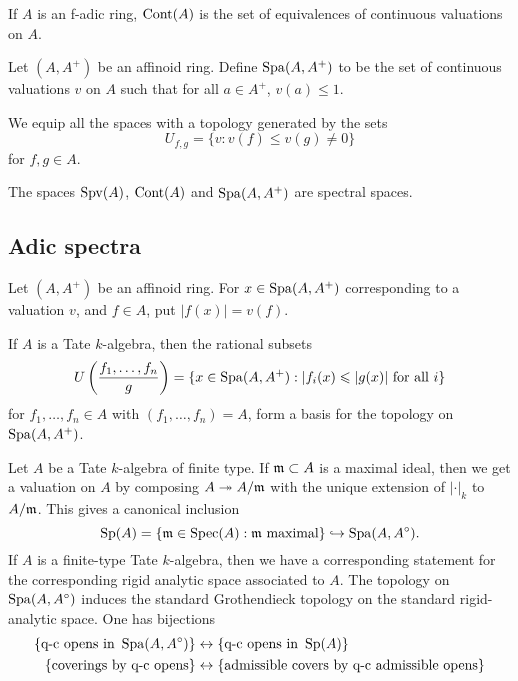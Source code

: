 \begin{definition}
If $A$ is an f-adic ring, $\operatorname{Cont}(A)$ is the set of equivalences of continuous 
valuations on $A$. 
\end{definition}

\begin{definition}
Let $(A,A^+)$ be an affinoid ring. Define $\operatorname{Spa}(A,A^+)$ to be the set of 
continuous valuations $v$ on $A$ such that for all $a\in A^+$, 
$v(a)\leqslant 1$. 
\end{definition}

We equip all the spaces with a topology generated by the sets 
\[
  U_{f,g} = \{v : v(f)\leqslant v(g)\ne 0\}
\]
for $f,g\in A$. 

\begin{theorem}
The spaces $\operatorname{Spv}(A)$, $\operatorname{Cont}(A)$ and $\operatorname{Spa}(A,A^+)$ are spectral spaces. 
\end{theorem}





\subsection{Adic spectra}

Let $(A,A^+)$ be an affinoid ring. For $x\in \operatorname{Spa}(A,A^+)$ corresponding to a 
valuation $v$, and $f\in A$, put $|f(x)| = v(f)$. 

If $A$ is a Tate $k$-algebra, then the rational subsets 
\[
  U\left(\frac{f_1,\dots,f_n}{g}\right) = \{x\in \operatorname{Spa}(A,A^+):|f_i(x)\leqslant |g(x)|\text{ for all }i\}
\]
for $f_1,\dots,f_n\in A$ with $(f_1,\dots,f_n) = A$, form a basis for the 
topology on $\operatorname{Spa}(A,A^+)$. 

\begin{example}
Let $A$ be a Tate $k$-algebra of finite type. If $\mathfrak{m}\subset A$ is a maximal 
ideal, then we get a valuation on $A$ by composing $A\twoheadrightarrow A/\mathfrak{m}$ 
with the unique extension of $|\cdot |_k$ to $A/\mathfrak{m}$. This gives a canonical 
inclusion 
\[
  \operatorname{Sp}(A)=\{\mathfrak{m}\in\operatorname{Spec}(A):\mathfrak{m}\text{ maximal}\}\hookrightarrow \operatorname{Spa}(A,A^\circ) .
\]
If $A$ is a finite-type Tate $k$-algebra, then we have a corresponding statement 
for the corresponding rigid analytic space associated to $A$. The topology on 
$\operatorname{Spa}(A,A^\circ)$ induces the standard Grothendieck topology on the standard 
rigid-analytic space. One has bijections  
\begin{align*}
  \{\text{q-c opens in }\operatorname{Spa}(A,A^\circ)\} 
    &\leftrightarrow \{\text{q-c opens in }\operatorname{Sp}(A)\} \\
  \{\text{coverings by q-c opens}\} 
    &\leftrightarrow\{\text{admissible covers by q-c admissible opens}\}
\end{align*}
\end{example}

